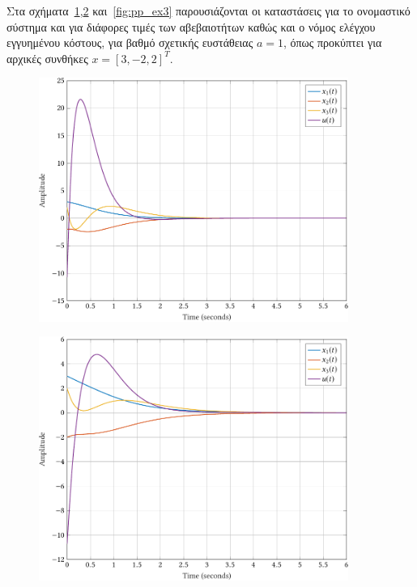 Στα σχήματα~\ref{fig:pp_ex1},\ref{fig:pp_ex2} και~\ref{fig:pp_ex3} παρουσιάζονται οι
καταστάσεις για το ονομαστικό σύστημα και για διάφορες τιμές των αβεβαιοτήτων καθώς
και ο νόμος ελέγχου εγγυημένου κόστους, για βαθμό σχετικής ευστάθειας \( a = 1
\), όπως προκύπτει για αρχικές συνθήκες \( x = [3, -2, 2]^T \).
\begin{figure}[h]
    \centering
    \includegraphics[width=0.9\textwidth]{figures/pp_ex1.pdf}
    \label{fig:pp_ex1}
\end{figure}
\begin{figure}[h]
    \centering
    \includegraphics[width=0.9\textwidth]{figures/pp_ex2.pdf}
    \label{fig:pp_ex2}
\end{figure}
